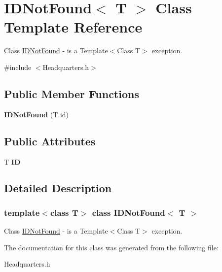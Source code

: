 \hypertarget{class_i_d_not_found}{}\section{I\+D\+Not\+Found$<$ T $>$ Class Template Reference}
\label{class_i_d_not_found}


Class \hyperlink{class_i_d_not_found}{I\+D\+Not\+Found} -\/ is a Template$<$\+Class T$>$ exception.  




{\ttfamily \#include $<$Headquarters.\+h$>$}

\subsection*{Public Member Functions}
\begin{DoxyCompactItemize}
\item 
\mbox{\label{class_i_d_not_found_a7a86d553e70eb30f833c372a7f19d111}} 
{\bfseries I\+D\+Not\+Found} (T id)
\end{DoxyCompactItemize}
\subsection*{Public Attributes}
\begin{DoxyCompactItemize}
\item 
\mbox{\label{class_i_d_not_found_a97036384d57c39d0389195678efe934a}} 
T {\bfseries ID}
\end{DoxyCompactItemize}


\subsection{Detailed Description}
\subsubsection*{template$<$class T$>$\newline
class I\+D\+Not\+Found$<$ T $>$}

Class \hyperlink{class_i_d_not_found}{I\+D\+Not\+Found} -\/ is a Template$<$\+Class T$>$ exception. 

The documentation for this class was generated from the following file\+:\begin{DoxyCompactItemize}
\item 
Headquarters.\+h\end{DoxyCompactItemize}
